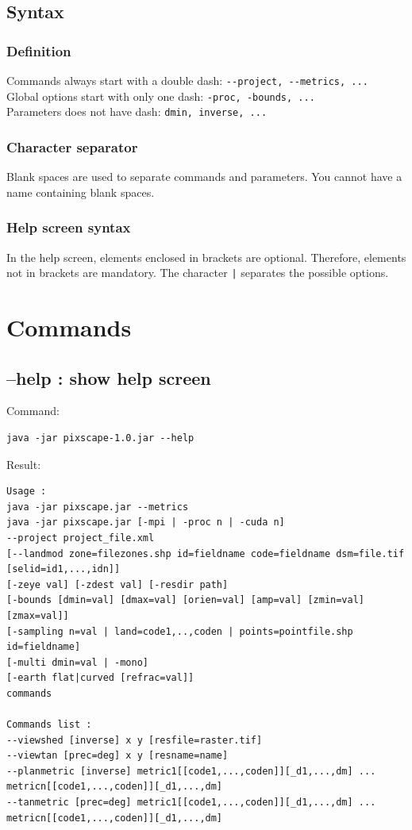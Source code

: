 \documentclass{report}
\begin{document}
\subsection{Syntax}
\subsubsection{Definition}
Commands always start with a double dash: \verb|--project, --metrics, ...|\\
Global options start with only one dash: \verb|-proc, -bounds, ...|\\
Parameters does not have dash: \verb|dmin, inverse, ...|

\subsubsection{Character separator}
Blank spaces are used to separate commands and parameters.  You cannot have a name containing blank spaces.

\subsubsection{Help screen syntax}
In the help screen, elements enclosed in brackets are optional. Therefore, elements not in brackets are mandatory. The character \verb+|+ separates the possible options.

\section{Commands}

\subsection{--help : show help screen}
Command:
\begin{Verbatim}
java -jar pixscape-1.0.jar --help
\end{Verbatim}
Result:
\begin{Verbatim}
Usage :
java -jar pixscape.jar --metrics
java -jar pixscape.jar [-mpi | -proc n | -cuda n]
--project project_file.xml
[--landmod zone=filezones.shp id=fieldname code=fieldname dsm=file.tif [selid=id1,...,idn]]
[-zeye val] [-zdest val] [-resdir path]
[-bounds [dmin=val] [dmax=val] [orien=val] [amp=val] [zmin=val] [zmax=val]]
[-sampling n=val | land=code1,..,coden | points=pointfile.shp id=fieldname]
[-multi dmin=val | -mono]
[-earth flat|curved [refrac=val]]
commands

Commands list :
--viewshed [inverse] x y [resfile=raster.tif]
--viewtan [prec=deg] x y [resname=name]
--planmetric [inverse] metric1[[code1,...,coden]][_d1,...,dm] ... metricn[[code1,...,coden]][_d1,...,dm]
--tanmetric [prec=deg] metric1[[code1,...,coden]][_d1,...,dm] ... metricn[[code1,...,coden]][_d1,...,dm]
\end{Verbatim}
\end{document}
